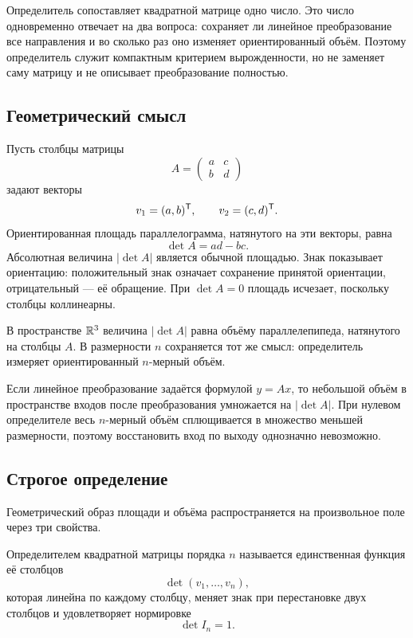 Определитель сопоставляет квадратной матрице одно число. Это число одновременно отвечает на два вопроса: сохраняет ли линейное преобразование все направления и во сколько раз оно изменяет ориентированный объём. Поэтому определитель служит компактным критерием вырожденности, но не заменяет саму матрицу и не описывает преобразование полностью.

\subsection{Геометрический смысл}

Пусть столбцы матрицы
\[
A=\begin{pmatrix}a&c\\ b&d\end{pmatrix}
\]
задают векторы
\[
v_1=(a,b)^{\mathsf{T}},
\qquad
v_2=(c,d)^{\mathsf{T}}.
\]
Ориентированная площадь параллелограмма, натянутого на эти векторы, равна
\[
\det A=ad-bc.
\]
Абсолютная величина \(\lvert\det A\rvert\) является обычной площадью. Знак показывает ориентацию: положительный знак означает сохранение принятой ориентации, отрицательный --- её обращение. При \(\det A=0\) площадь исчезает, поскольку столбцы коллинеарны.

В пространстве \(\mathbb{R}^3\) величина \(\lvert\det A\rvert\) равна объёму параллелепипеда, натянутого на столбцы \(A\). В размерности \(n\) сохраняется тот же смысл: определитель измеряет ориентированный \(n\)-мерный объём.

\begin{application}
Если линейное преобразование задаётся формулой \(y=Ax\), то небольшой объём в пространстве входов после преобразования умножается на \(\lvert\det A\rvert\). При нулевом определителе весь \(n\)-мерный объём сплющивается в множество меньшей размерности, поэтому восстановить вход по выходу однозначно невозможно.
\end{application}

\subsection{Строгое определение}

Геометрический образ площади и объёма распространяется на произвольное поле через три свойства.

\begin{definition}
Определителем квадратной матрицы порядка \(n\) называется единственная функция её столбцов
\[
\det(v_1,\dots,v_n),
\]
которая линейна по каждому столбцу, меняет знак при перестановке двух столбцов и удовлетворяет нормировке
\[
\det I_n=1.
\]
\end{definition}

